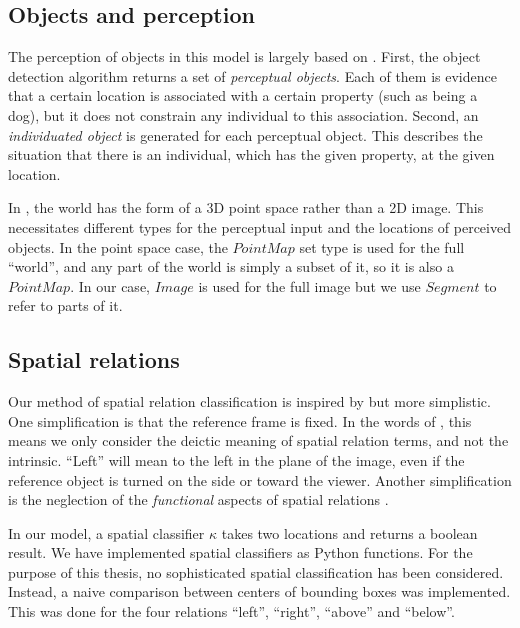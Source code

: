 \subsection{Objects and perception}

The perception of objects in this model is largely based on \cite{lspc}.
First, the object detection algorithm returns a set of \textit{perceptual objects}.
Each of them is evidence that a certain location is associated with a certain property (such as being a dog), but it does not constrain any individual to this association.
Second, an \textit{individuated object} is generated for each perceptual object.
This describes the situation that there is an individual, which has the given property, at the given location.

In \cite{lspc}, the world has the form of a 3D point space rather than a 2D image.
This necessitates different types for the perceptual input and the locations of perceived objects.
In the point space case, the $PointMap$ set type is used for the full ``world'', and any part of the world is simply a subset of it, so it is also a $PointMap$.
In our case, $Image$ is used for the full image but we use $Segment$ to refer to parts of it.



\subsection{Spatial relations}
\label{sec:method-spatrel}

Our method of spatial relation classification is inspired by \cite{ttrspat} but more simplistic.
One simplification is that the reference frame is fixed.
In the words of \cite{Garnhamunifiedtheorymeaning1989}, this means we only consider the deictic meaning of spatial relation terms, and not the intrinsic.
``Left'' will mean to the left in the plane of the image, even if the reference object is turned on the side or toward the viewer.
Another simplification is the neglection of the \textit{functional} aspects of spatial relations \citep{CoventryInterplayGeometryFunction2001}.

In our model, a spatial classifier $\kappa$ takes two locations and returns a boolean result.
We have implemented spatial classifiers as Python functions.
For the purpose of this thesis, no sophisticated spatial classification has been considered.
Instead, a naive comparison between centers of bounding boxes was implemented.
This was done for the four relations ``left'', ``right'', ``above'' and ``below''.



